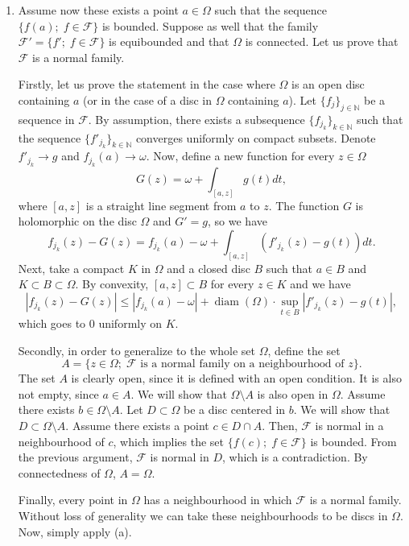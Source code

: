 \documentclass[a4paper, 12pt]{article} %
\DeclareMathOperator{\diam}{diam}
\newcommand{\N}{\mathbb{N}}
\begin{document}
\begin{enumerate}[label=(\alph*)]
	\item Assume now these exists a point $a \in \Omega$ such that the sequence $\lbrace f(a) ; \; f \in \mathcal{F} \rbrace$ is bounded. Suppose as well that the family $\mathcal{F}' = \lbrace f' ; \; f \in \mathcal{F} \rbrace$ is equibounded and that $\Omega$ is connected. Let us prove that $\mathcal{F}$ is a normal family.
	
	Firstly, let us prove the statement in the case where $\Omega$ is an open disc containing $a$ (or in the case of a disc in $\Omega$ containing $a$). Let $\lbrace f_j\rbrace_{j \in \N}$ be a sequence in $\mathcal{F}$. By assumption, there exists a subsequence $\lbrace f_{j_k}\rbrace_{k \in \N}$ such that the sequence $\lbrace f'_{j_k}\rbrace_{k \in \N}$ converges uniformly on compact subsets. Denote $f'_{j_k} \to g$ and $f_{j_k}(a) \to \omega$. Now, define a new function for every $z \in \Omega$
	\[
	G(z) = \omega + \int_{[a, z]}g(t)dt,
	\]
	where $[a, z]$ is a straight line segment from $a$ to $z$. The function $G$ is holomorphic on the disc $\Omega$ and $G' = g$, so we have
	\[
	f_{j_k}(z)-G(z) = f_{j_k}(a) - \omega + \int_{[a, z]}(f'_{j_k}(z)-g(t))dt.
	\]
	Next, take a compact $K$ in $\Omega$ and a closed disc $B$ such that $a \in B$ and $K \subset B \subset \Omega$. By convexity, $[a, z] \subset B$ for every $z \in K$ and we have
	\[
	|f_{j_k}(z)-G(z)| \leq |f_{j_k}(a) - \omega| + \diam(\Omega)\cdot\sup_{t \in B}|f'_{j_k}(z)-g(t)|,
	\]
	which goes to $0$ uniformly on $K$.
	
	Secondly, in order to generalize to the whole set $\Omega$, define the set
	\[A = \lbrace z \in \Omega ; \; \mathcal{F} \text{ is a normal family on a neighbourhood of } z\rbrace.
	\]
	The set $A$ is clearly open, since it is defined with an open condition. It is also not empty, since $a \in A$. We will show that $\Omega\setminus A$ is also open in $\Omega$. Assume there exists $b \in \Omega \setminus A$. Let $D\subset\Omega$ be a disc centered in $b$. We will show that $D \subset \Omega \setminus A$. Assume there exists a point $c \in D \cap A$. Then, $\mathcal{F}$ is normal in a neighbourhood of $c$, which implies the set $\lbrace f(c) ; \; f \in \mathcal{F}\rbrace$ is bounded. From the previous argument, $\mathcal{F}$ is normal in $D$, which is a contradiction. By connectedness of $\Omega$, $A = \Omega$.
	
	Finally, every point in $\Omega$ has a neighbourhood in which $\mathcal{F}$ is a normal family. Without loss of generality we can take these neighbourhoods to be discs in $\Omega$. Now, simply apply (a).
\end{enumerate}
\end{document}
